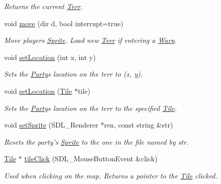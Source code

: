 \begin{DoxyCompactItemize}
\begin{DoxyCompactList}\small\item\em Returns the current \hyperlink{class_terr}{Terr}. \end{DoxyCompactList}\item 
void \hyperlink{class_party_a729f2e7fd90ec533a9173a5468b046fa}{move} (dir d, bool interrupt=true)\hypertarget{class_party_a729f2e7fd90ec533a9173a5468b046fa}{}\label{class_party_a729f2e7fd90ec533a9173a5468b046fa}

\begin{DoxyCompactList}\small\item\em Move player\textquotesingle{}s \hyperlink{class_sprite}{Sprite}. Load new \hyperlink{class_terr}{Terr} if entering a \hyperlink{class_warp}{Warp}. \end{DoxyCompactList}\item 
void \hyperlink{class_party_a2efe239264b319d3b50e1a5957fcd859}{set\+Location} (int x, int y)\hypertarget{class_party_a2efe239264b319d3b50e1a5957fcd859}{}\label{class_party_a2efe239264b319d3b50e1a5957fcd859}

\begin{DoxyCompactList}\small\item\em Sets the \hyperlink{class_party}{Party}\textquotesingle{}s location on the terr to (x, y). \end{DoxyCompactList}\item 
void \hyperlink{class_party_aa4090eed5abc44d79c5ff91b81b23d2b}{set\+Location} (\hyperlink{class_tile}{Tile} $\ast$tile)\hypertarget{class_party_aa4090eed5abc44d79c5ff91b81b23d2b}{}\label{class_party_aa4090eed5abc44d79c5ff91b81b23d2b}

\begin{DoxyCompactList}\small\item\em Sets the \hyperlink{class_party}{Party}\textquotesingle{}s location on the terr to the specified \hyperlink{class_tile}{Tile}. \end{DoxyCompactList}\item 
void \hyperlink{class_party_abe069ffbbf3352f6b39246c8382dd26b}{set\+Sprite} (S\+D\+L\+\_\+\+Renderer $\ast$ren, const string \&str)\hypertarget{class_party_abe069ffbbf3352f6b39246c8382dd26b}{}\label{class_party_abe069ffbbf3352f6b39246c8382dd26b}

\begin{DoxyCompactList}\small\item\em Resets the party’s \hyperlink{class_sprite}{Sprite} to the one in the file named by str. \end{DoxyCompactList}\item 
\hyperlink{class_tile}{Tile} $\ast$ \hyperlink{class_party_a5ab0f256d2d95b231dd6ae53c1f8a2f4}{tile\+Click} (S\+D\+L\+\_\+\+Mouse\+Button\+Event \&click)\hypertarget{class_party_a5ab0f256d2d95b231dd6ae53c1f8a2f4}{}\label{class_party_a5ab0f256d2d95b231dd6ae53c1f8a2f4}

\begin{DoxyCompactList}\small\item\em Used when clicking on the map. Returns a pointer to the \hyperlink{class_tile}{Tile} clicked. \end{DoxyCompactList}\end{DoxyCompactItemize}
